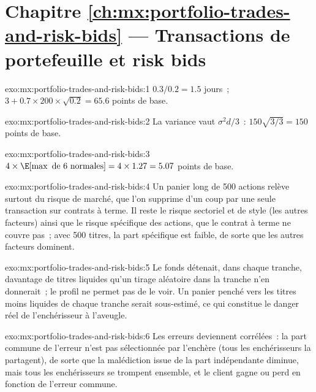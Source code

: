 \section*{Chapitre \ref{ch:mx:portfolio-trades-and-risk-bids} --- Transactions de portefeuille et risk bids}

\begin{solution}{exo:mx:portfolio-trades-and-risk-bids:1}
$0.3/0.2=1.5$ jours~; $3+0.7\times200\times\sqrt{0.2}=65.6$ points de base.
\end{solution}

\begin{solution}{exo:mx:portfolio-trades-and-risk-bids:2}
La variance vaut $\sigma^2d/3$~: $150\sqrt{3/3}=150$ points de base.
\end{solution}

\begin{solution}{exo:mx:portfolio-trades-and-risk-bids:3}
$4\times\E[\max\text{ de 6 normales}]=4\times1.27=5.07$ points de base.
\end{solution}

\begin{solution}{exo:mx:portfolio-trades-and-risk-bids:4}
Un panier long de 500 actions relève surtout du risque de marché, que l'on supprime d'un coup par une seule transaction sur contrats à terme. Il reste le risque sectoriel et de style (les autres
facteurs) ainsi que le risque spécifique des actions, que le contrat à terme ne couvre pas~; avec 500 titres, la part spécifique est faible, de sorte que les autres facteurs dominent.
\end{solution}

\begin{solution}{exo:mx:portfolio-trades-and-risk-bids:5}
Le fonds détenait, dans chaque tranche, davantage de titres liquides qu'un tirage aléatoire dans la tranche n'en donnerait~; le profil ne permet pas de le voir. Un panier penché vers les titres
moins liquides de chaque tranche serait sous-estimé, ce qui constitue le danger réel de l'enchérisseur à l'aveugle.
\end{solution}

\begin{solution}{exo:mx:portfolio-trades-and-risk-bids:6}
Les erreurs deviennent corrélées~: la part commune de l'erreur n'est pas sélectionnée par l'enchère (tous les enchérisseurs la partagent), de sorte que la malédiction issue de la part indépendante diminue,
mais tous les enchérisseurs se trompent ensemble, et le client gagne ou perd en fonction de l'erreur commune.
\end{solution}

